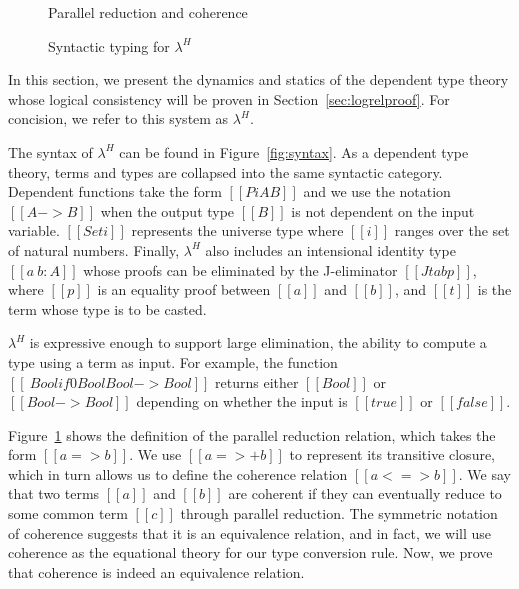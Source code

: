 \documentclass[nonacm]{acmart}
\newcommand{\lang}{$\lambda^H$\xspace}
\begin{document}
\begin{figure}[h]
\caption{Parallel reduction and coherence}
\label{fig:par}
\end{figure}

\begin{figure}[h]
\caption{Syntactic typing for \lang}
\label{fig:typing}
\end{figure}


In this section, we present the dynamics and statics of the
dependent type theory whose logical consistency will be proven in
Section~\ref{sec:logrelproof}. For concision, we refer to this system
as \lang.

The syntax of \lang can be found in Figure~\ref{fig:syntax}. As a
dependent type theory, terms and types are collapsed into the same
syntactic category. Dependent functions take the form $[[Pi A B]]$ and
we use the notation $[[A -> B]]$ when the output type $[[B]]$ is not
dependent on the input variable. $[[Set i]]$ represents the universe
type where $[[i]]$ ranges over the set of natural numbers.
 Finally,
\lang also includes an intensional identity type $[[a ~ b : A]]$ whose
proofs can be eliminated by the J-eliminator $[[J t a b p]]$, where
$[[p]]$ is an equality proof between $[[a]]$ and $[[b]]$, and $[[t]]$
is the term whose type is to be casted.

\lang is expressive enough to support large
elimination, the ability to compute a type using a term as input. For
example, the function $[[\ Bool if 0 Bool Bool -> Bool]]$ returns
either $[[Bool]]$ or $[[Bool -> Bool]]$ depending on whether the input
is $[[true]]$ or $[[false]]$.

Figure~\ref{fig:par} shows the definition of the parallel reduction
relation, which takes the form $[[a => b]]$. We use $[[a =>+ b]]$ to
represent its transitive closure, which in turn allows us to define
the coherence relation $[[a <=> b]]$. %
We say that two terms $[[a]]$
and $[[b]]$ are coherent if they can eventually reduce to some common
term $[[c]]$ through parallel reduction. The symmetric notation of
coherence suggests that it is an equivalence relation, and in fact, we
will use coherence as the equational theory for our type conversion
rule. Now, we prove that coherence is indeed an equivalence relation.
\end{document}
